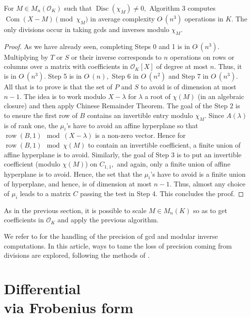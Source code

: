 \documentclass{sig-alternate-05-2015}
\DeclareMathOperator{\com}{Com}
\DeclareMathOperator{\disc}{Disc}
\DeclareMathOperator{\row}{row}
\newcommand{\OK}{\mathcal{O}_K}
\newcommand{\softO}{O\tilde{~}}
\begin{document}
\begin{theo}
For $M \in M_n(\OK)$ such that $\disc( \chi_M) \neq 0,$
Algorithm 3 computes
$\com (X-M) \pmod{\chi_M}$ in average complexity $\softO (n^3)$
operations in $K$.
The only divisions occur in taking gcds and inverses modulo $\chi_M$.
\end{theo}
\begin{proof}
As we have already seen, completing Steps 0 and 1 is in $\softO (n^3).$
Multiplying by $T$ or $S$ or their inverse corresponds
to $n$ operations on rows or columns over a matrix with coefficients
in $\OK[X]$ of degree at most $n.$
Thus, it is in $\softO (n^3).$
Step 5 is in $\softO (n),$ Step 6 in $\softO(n^2)$ and Step 7 in $\softO(n^3)$.
All that is to prove is that the set of $P$ and $S$ to avoid
is of dimension at most $n-1.$
The idea is to work modulo $X-\lambda$
for $\lambda$ a root of $\chi (M)$ (in an algebraic closure)
and then apply Chinese Remainder Theorem.
The goal of the Step $2$ is to ensure the first row of $B$ contains an
invertible entry modulo $\chi_M.$
Since $A(\lambda)$ is of rank one, the $\mu_i$'s have to avoid an
affine hyperplane so that $\row(B,1) \mod (X-\lambda)$ is a non-zero vector.
Hence for $\row(B,1) \mod \chi (M)$ to contain an invertible coefficient,
a finite union of affine hyperplane is to avoid.
Similarly, the goal of Step 3 is to put an invertible coefficient (modulo
$\chi(M)$) on $C_{1,1},$ and again, only a finite union of affine
hyperplane is to avoid.
Hence, the set that the $\mu_i$'s have to avoid is a finite union
of hyperplane, and hence, is of dimension at most $n-1.$
Thus, almost any choice of $\mu_i$ leads to a matrix $C$ passing the test
in Step 4.
This concludes the proof.
\end{proof}


\begin{rem}
As in the previous section, it is possible
to scale $M \in M_n(K)$ so as to
get coefficients in $\OK$ and apply the previous algorithm.
\end{rem}
\begin{rem}
We refer to \cite{caruso:15a} for the handling
of the precision of gcd and modular inverse computations.
In this article, ways to tame the loss of precision
coming from divisions are explored, following
the methods of \cite{caruso-roe-vaccon:14a}.
\end{rem}


\section{Differential\\via Frobenius form}
\label{sec:diffFrob}
\end{document}
